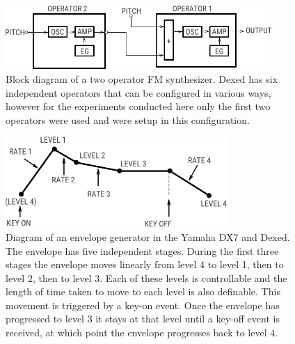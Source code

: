 \begin{figure}[ht]
    \centering
    \includegraphics[width=0.9\textwidth]{figures/spiegelib/two_op_fm_block.png}
    \caption{Block diagram of a two operator FM synthesizer. Dexed has six independent operators that can be configured in various ways, however for the experiments conducted here only the first two operators were used and were setup in this configuration.}
    \label{fig:two_op_fm_block}
\end{figure}

\begin{figure}[ht]
    \centering
    \includegraphics[width=0.75\textwidth]{figures/spiegelib/Yamaha DX7 Envelope.png}
    \caption{Diagram of an envelope generator in the Yamaha DX7 and Dexed. The envelope has five independent stages. During the first three stages the envelope moves linearly from level 4 to level 1, then to level 2, then to level 3. Each of these levels is controllable and the length of time taken to move to each level is also definable. This movement is triggered by a key-on event. Once the envelope has progressed to level 3 it stays at that level until a key-off event is received, at which point the envelope progresses back to level 4.}
    \label{fig:dx7_envelope}
\end{figure}


